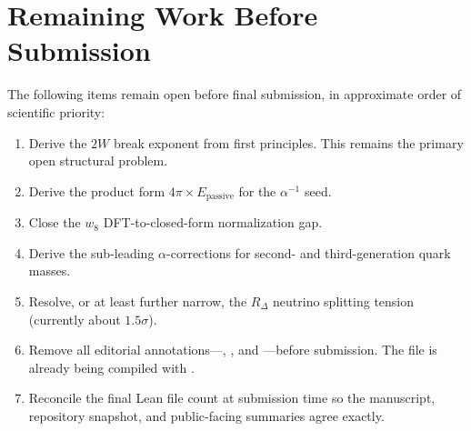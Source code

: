 \documentclass[11pt,a4paper]{article}
\theoremstyle{plain}
\theoremstyle{definition}
\theoremstyle{remark}
\newcommand{\submissionwork}[1]{\textcolor{submissionwork}{#1}}
\begin{document}
\section*{\submissionwork{Remaining Work Before Submission}}

\submissionwork{The following items remain open before final submission, in approximate order of scientific priority:}
\begin{enumerate}[nosep]
\item \submissionwork{Derive the $2W$ break exponent from first principles. This remains the primary open structural problem.}
\item \submissionwork{Derive the product form $4\pi \times E_{\mathrm{passive}}$ for the $\alpha^{-1}$ seed.}
\item \submissionwork{Close the $w_8$ DFT-to-closed-form normalization gap.}
\item \submissionwork{Derive the sub-leading $\alpha$-corrections for second- and third-generation quark masses.}
\item \submissionwork{Resolve, or at least further narrow, the $R_\Delta$ neutrino splitting tension (currently about $1.5\sigma$).}
\item \submissionwork{Remove all editorial annotations---\texttt{\string\RNOTE}, \texttt{\string\BFIX}, and \texttt{\string\PNOTE}---before submission. The file is already being compiled with \texttt{\string\showrefcommentsfalse}.}
\item \submissionwork{Reconcile the final Lean file count at submission time so the manuscript, repository snapshot, and public-facing summaries agree exactly.}
\end{enumerate}
\end{document}
